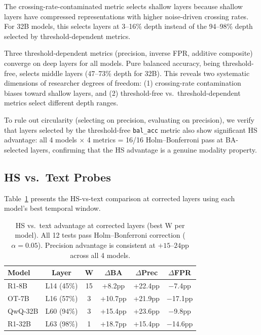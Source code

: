 \documentclass[11pt,a4paper]{article}
\newcommand{\pp}{\text{pp}}
\begin{document}
The crossing-rate-contaminated metric selects shallow layers because shallow layers have compressed representations with higher noise-driven crossing rates.
For 32B models, this selects layers at 3--16\% depth instead of the 94--98\% depth selected by threshold-dependent metrics.

Three threshold-dependent metrics (precision, inverse FPR, additive composite) converge on deep layers for all models.
Pure balanced accuracy, being threshold-free, selects middle layers (47--73\% depth for 32B).
This reveals two systematic dimensions of researcher degrees of freedom: (1) crossing-rate contamination biases toward shallow layers, and (2) threshold-free vs.\ threshold-dependent metrics select different depth ranges.

To rule out circularity (selecting on precision, evaluating on precision), we verify that layers selected by the threshold-free \texttt{bal\_acc} metric also show significant HS advantage: all 4 models $\times$ 4 metrics = 16/16 Holm--Bonferroni pass at BA-selected layers, confirming that the HS advantage is a genuine modality property.

\subsection{HS vs.\ Text Probes}
\label{sec:hs-vs-text}

Table~\ref{tab:hs-vs-text} presents the HS-vs-text comparison at corrected layers using each model's best temporal window.

\begin{table}[t]
\centering
\small
\begin{tabular}{lccccc}
\toprule
\textbf{Model} & \textbf{Layer} & \textbf{W} & \textbf{$\Delta$BA} & \textbf{$\Delta$Prec} & \textbf{$\Delta$FPR} \\
\midrule
R1-8B & L14 (45\%) & 15 & +8.2$\pp$ & +22.4$\pp$ & $-$7.4$\pp$ \\
OT-7B & L16 (57\%) & 3 & +10.7$\pp$ & +21.9$\pp$ & $-$17.1$\pp$ \\
QwQ-32B & L60 (94\%) & 3 & +15.4$\pp$ & +23.6$\pp$ & $-$9.8$\pp$ \\
R1-32B & L63 (98\%) & 1 & +18.7$\pp$ & +15.4$\pp$ & $-$14.6$\pp$ \\
\bottomrule
\end{tabular}
\caption{HS vs.\ text advantage at corrected layers (best W per model). All 12 tests pass Holm--Bonferroni correction ($\alpha=0.05$). Precision advantage is consistent at $+15$--$24\pp$ across all 4 models.}
\label{tab:hs-vs-text}
\end{table}
\end{document}
